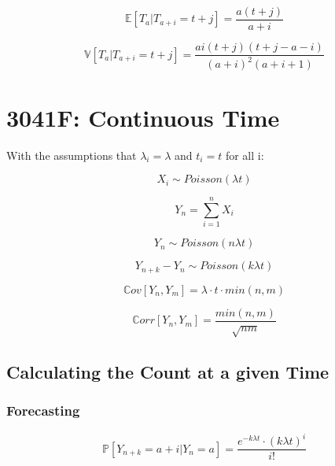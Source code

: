 \documentclass[12pt]{article}
\begin{document}
    \begin{equation}
        \mathbb{E}[T_a | T_{a + i} = t + j] = \frac{a (t + j)}{ a + i }
    \end{equation}


    \begin{equation}
        \mathbb{V}[T_a | T_{a + i} = t + j] = 
        \frac{
            a i (t + j) (t + j - a - i)
        }{
            (a + i)^2 (a + i + 1)
        }
    \end{equation}
\section{3041F: Continuous Time}
    With the assumptions that \(\lambda_i = \lambda\) and \(t_i = t\) for all i:

    \begin{equation}
        X_i \sim Poisson(\lambda t)
    \end{equation}

    \begin{equation}
        Y_n = \sum_{i = 1}^{n} X_i
    \end{equation}

    \begin{equation}
        Y_n \sim Poisson(n \lambda t)
    \end{equation}

    \begin{equation}
        Y_{n+k} - Y_n \sim Poisson(k \lambda t)
    \end{equation}

    \begin{equation}
        \mathbb{C}ov[Y_n, Y_m] = \lambda \cdot t \cdot min(n, m)
    \end{equation}

    \begin{equation}
        \mathbb{C}orr[Y_n, Y_m] = \frac{min(n, m)}{\sqrt{nm}}
    \end{equation}

    \subsection{Calculating the Count at a given Time}
    \subsubsection{Forecasting}
    \begin{equation}
        \mathbb{P}[Y_{n + k} = a + i | Y_n = a] =
        \frac{
            e^{-k \lambda t} \cdot (k \lambda t)^i
        }{ i! }
    \end{equation}
\end{document}
